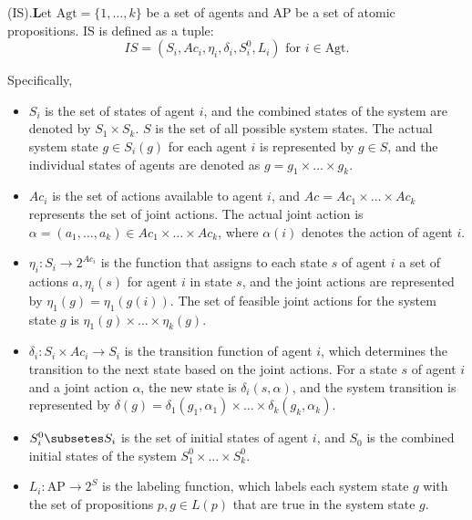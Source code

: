 \begin{definition}(IS).\textbf Let \( \text{Agt} = \{1,\ldots,k\} \) be a set of agents and \( \text{AP} \) be a set of atomic propositions. IS is defined as a tuple:
    \[ IS = (S_i, Ac_i, \eta_i, \delta_i, S_i^0, L_i) \text{ for } i \in \text{Agt}. \]
    
    Specifically,
    \begin{itemize}
        \item \( S_i \) is the set of states of agent \( i \), and the combined states of the system are denoted by \( S_1 \times S_k \). \( S \) is the set of all possible system states. The actual system state \( g \in S_i(g) \) for each agent \( i \) is represented by \( g \in S \), and the individual states of agents are denoted as \( g = g_1 \times \ldots \times g_k \).
        \item \( Ac_i \) is the set of actions available to agent \( i \), and \( Ac = Ac_1 \times \ldots \times Ac_k \) represents the set of joint actions. The actual joint action is \( \alpha = (a_1,\ldots,a_k) \in Ac_1 \times \ldots \times Ac_k \), where \( \alpha(i) \) denotes the action of agent \( i \).
        \item \( \eta_i: S_i \rightarrow 2^{Ac_i} \) is the function that assigns to each state \( s \) of agent \( i \) a set of actions \( a, \eta_i(s) \) for agent \( i \) in state \( s \), and the joint actions are represented by \( \eta_1(g) = \eta_1(g(i)) \). The set of feasible joint actions for the system state \( g \) is \( \eta_1(g) \times \ldots \times \eta_k(g) \).
        \item \( \delta_i: S_i \times Ac_i \rightarrow S_i \) is the transition function of agent \( i \), which determines the transition to the next state based on the joint actions. For a state \( s \) of agent \( i \) and a joint action \( \alpha \), the new state is \( \delta_i(s, \alpha) \), and the system transition is represented by \( \delta(g) = \delta_1(g_1, \alpha_1) \times \ldots \times \delta_k(g_k, \alpha_k) \).
        \item \( S_i^0 \subsetes S_i \) is the set of initial states of agent \( i \), and \( S_0 \) is the combined initial states of the system \( S_1^0 \times \ldots \times S_k^0 \).
        \item \( L_i: \text{AP} \rightarrow 2^S \) is the labeling function, which labels each system state \( g \) with the set of propositions \( p, g \in L(p) \) that are true in the system state \( g \).
    \end{itemize}    
    \end{definition}



